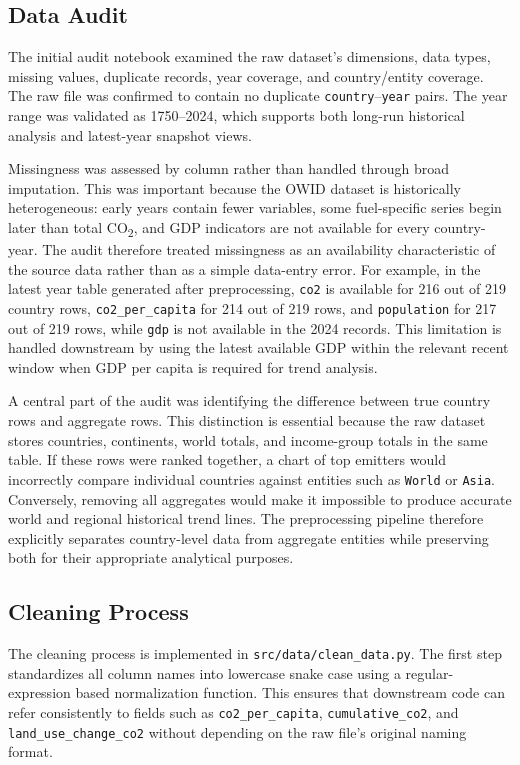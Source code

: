 \documentclass[a4paper,12pt]{article}
\begin{document}
\subsection{Data Audit}

The initial audit notebook examined the raw dataset's dimensions, data types, missing
values, duplicate records, year coverage, and country/entity coverage. The raw file was
confirmed to contain no duplicate \texttt{country}--\texttt{year} pairs. The year range
was validated as 1750--2024, which supports both long-run historical analysis and
latest-year snapshot views.

Missingness was assessed by column rather than handled through broad imputation. This was
important because the OWID dataset is historically heterogeneous: early years contain
fewer variables, some fuel-specific series begin later than total CO\textsubscript{2}, and
GDP indicators are not available for every country-year. The audit therefore treated
missingness as an availability characteristic of the source data rather than as a simple
data-entry error. For example, in the latest year table generated after preprocessing,
\texttt{co2} is available for 216 out of 219 country rows, \texttt{co2\_per\_capita} for
214 out of 219 rows, and \texttt{population} for 217 out of 219 rows, while \texttt{gdp}
is not available in the 2024 records. This limitation is handled downstream by using the
latest available GDP within the relevant recent window when GDP per capita is required
for trend analysis.

A central part of the audit was identifying the difference between true country rows and
aggregate rows. This distinction is essential because the raw dataset stores countries,
continents, world totals, and income-group totals in the same table. If these rows were
ranked together, a chart of top emitters would incorrectly compare individual countries
against entities such as \texttt{World} or \texttt{Asia}. Conversely, removing all
aggregates would make it impossible to produce accurate world and regional historical
trend lines. The preprocessing pipeline therefore explicitly separates country-level data
from aggregate entities while preserving both for their appropriate analytical purposes.

\subsection{Cleaning Process}

The cleaning process is implemented in \texttt{src/data/clean\_data.py}. The first step
standardizes all column names into lowercase snake case using a regular-expression based
normalization function. This ensures that downstream code can refer consistently to fields
such as \texttt{co2\_per\_capita}, \texttt{cumulative\_co2}, and \texttt{land\_use\_change\_co2}
without depending on the raw file's original naming format.
\end{document}
